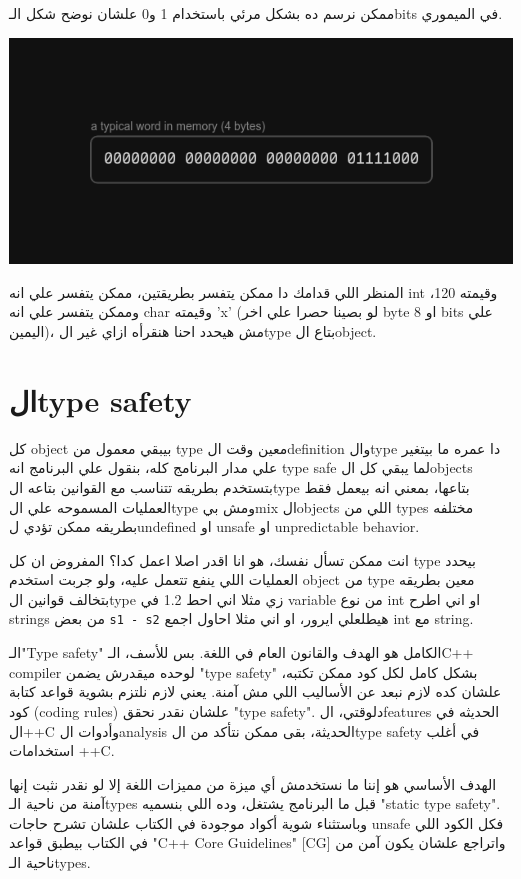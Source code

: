 \documentclass[11pt]{article}
\begin{document}
ممكن نرسم ده بشكل مرئي باستخدام 1 و0 علشان نوضح شكل الـbits في الميموري.

\begin{center}
\includegraphics[width=.9\linewidth]{../images/word_in_memory.png}
\end{center}

المنظر اللي قدامك دا ممكن يتفسر بطريقتين، ممكن يتفسر علي انه int وقيمته 120، وممكن يتفسر علي انه char وقيمته 'x' (لو بصينا حصرا علي اخر byte او 8 bits علي اليمين)، مش هيحدد احنا هنقرأه ازاي غير الtype بتاع الobject.
\section{الtype safety}
\label{sec:orga8da68f}
كل object بيبقي معمول من type معين وقت الdefinition والtype دا عمره ما بيتغير علي مدار البرنامج كله، بنقول علي البرنامج انه type safe لما يبقي كل الobjects بتستخدم بطريقه تتناسب مع القوانين بتاعه الtype بتاعها، بمعني انه بيعمل فقط العمليات المسموحه علي الtype ومش بيmix الobjects اللي من types مختلفه بطريقه ممكن تؤدي لundefined او unsafe او unpredictable behavior.

انت ممكن تسأل نفسك، هو انا اقدر اصلا اعمل كدا؟ المفروض ان كل type بيحدد العمليات اللي ينفع تتعمل عليه، ولو جربت استخدم object من type معين بطريقه بتخالف قوانين الtype زي مثلا اني احط 1.2 في variable من نوع int او اني اطرح strings من بعض \texttt{s1 - s2} هيطلعلي ايرور، او اني مثلا احاول اجمع int مع string.

الـ"Type safety" الكامل هو الهدف والقانون العام في اللغة. بس للأسف، الـC++ compiler لوحده ميقدرش يضمن "type safety" بشكل كامل لكل كود ممكن تكتبه، علشان كده لازم نبعد عن الأساليب اللي مش آمنة. يعني لازم نلتزم بشوية قواعد كتابة كود (coding rules) علشان نقدر نحقق "type safety". دلوقتي، الfeatures الحديثه في ال++C وأدوات الanalysis الحديثة، بقى ممكن نتأكد من الtype safety في أغلب استخدامات ++C.

الهدف الأساسي هو إننا ما نستخدمش أي ميزة من مميزات اللغة إلا لو نقدر نثبت إنها آمنة من ناحية الـtypes قبل ما البرنامج يشتغل، وده اللي بنسميه "static type safety". وباستثناء شوية أكواد موجودة في الكتاب علشان تشرح حاجات unsafe فكل الكود اللي في الكتاب بيطبق قواعد "C++ Core Guidelines" [CG] واتراجع علشان يكون آمن من ناحية الـtypes.
\end{document}
